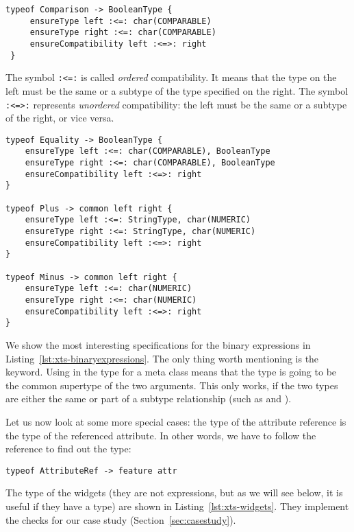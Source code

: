 \begin{lstlisting}[language=xts]
 typeof Comparison -> BooleanType {
     ensureType left :<=: char(COMPARABLE)
     ensureType right :<=: char(COMPARABLE)
     ensureCompatibility left :<=>: right
 } 
\end{lstlisting}


The symbol \verb|:<=:| is called \emph{ordered} compatibility. It
means that the type on the left must be the same or a subtype of the type
specified on the right. The symbol \verb|:<=>:| represents \emph{unordered}
compatibility: the left must be the same or a subtype of the right, or vice
versa.

\begin{lstlisting}[language=xts,float,label=lst:xts-binaryexpressions,caption=Some
rules for expressions.] 
typeof Equality -> BooleanType {
    ensureType left :<=: char(COMPARABLE), BooleanType
    ensureType right :<=: char(COMPARABLE), BooleanType
    ensureCompatibility left :<=>: right
}

typeof Plus -> common left right {
    ensureType left :<=: StringType, char(NUMERIC)
    ensureType right :<=: StringType, char(NUMERIC)
    ensureCompatibility left :<=>: right
} 

typeof Minus -> common left right {
    ensureType left :<=: char(NUMERIC)
    ensureType right :<=: char(NUMERIC)
    ensureCompatibility left :<=>: right
} 
\end{lstlisting}

We show the most interesting
specifications for the binary expressions
in Listing~\ref{lst:xts-binaryexpressions}.
The only thing worth mentioning is the  keyword. Using  in the
type for a meta class means that the type is going to be the common supertype of the two
arguments. This only works, if the two types are either the same or part of a
subtype relationship (such as  and ).

Let us now look at some more special cases: the type of the attribute reference
is the type of the referenced attribute. In other words, we have to follow the 
 reference to find out the type:

\begin{lstlisting}[language=xts]
typeof AttributeRef -> feature attr
\end{lstlisting}

The type of the widgets (they are not expressions, but as we will see below, it
is useful if they have a type) are shown in Listing~\ref{lst:xts-widgets}.
They implement the checks for our case study (Section~\ref{sec:casestudy}).

